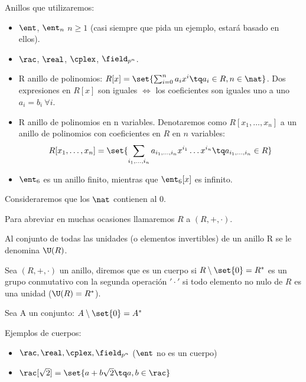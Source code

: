 \begin{example}
Anillos que utilizaremos:
\begin{itemize}
	\item $\ent$, $\ent_n$ $n \geq 1$ (casi siempre que pida un ejemplo, estará basado en ellos).
	\item $\rac$, $\real$, $\cplex$, $\field_{p^n}$.
	\item R anillo de polinomios: $R[x] = \set{ \sum_{i=0}^n a_i x^i \tq a_i \in R, n \in \nat}$. Dos expresiones en $R[x]$ son iguales $\iff$ los coeficientes son iguales uno a uno\ie $a_i = b_i \ \forall i$.
	\item R anillo de polinomios en n variables. Denotaremos como $R[x_1,\dots,x_n]$ a un anillo de polinomios con coeficientes en $R$ en $n$ variables:
	\[ R[x_1,\dots,x_n] = \set{ \sum_{i_1,\dots,i_n} a_{i_1,\dots,i_n} x^{i_1}\dots x^{i_n} \tq a_{i_1,\dots,i_n} \in R } \]
	\item $\ent_6$ es un anillo finito, mientras que $\ent_6[x]$ es infinito.
\end{itemize}
\end{example}


\nota Consideraremos que los $\nat$ contienen al 0.

\notacion Para abreviar en muchas ocasiones llamaremos $R$ a $(R,+,\cdot)$.


\begin{defn}[Unidades\IS de R: $\U(R)$]
Al conjunto de todas las unidades (o elementos invertibles) de un anillo R se le denomina $\U(R)$.
\end{defn}

\begin{defn}[Cuerpo]
Sea $(R,+,\cdot)$ un anillo, diremos que es un cuerpo si $R\setminus \set{0} = R^*$ es un grupo conmutativo con la segunda operación $'\cdot'$ \ie si todo elemento no nulo de $R$ es una unidad ($\U(R) = R^*$).
\end{defn}

\notacion Sea A un conjunto: $A\setminus \set{0} = A^*$

\begin{example} Ejemplos de cuerpos:
	\begin{itemize}
		\item $\rac, \real, \cplex, \field_{p^n}$ ($\ent$ no es un cuerpo) %
		\item $\rac[\sqrt2] = \set{ a + b\sqrt2 \tq a,b \in \rac }$
	\end{itemize}
\end{example}

